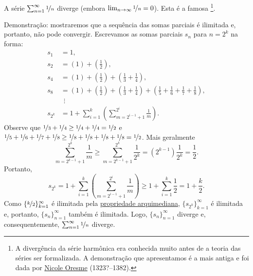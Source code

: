 \begin{example} \label{example:harmonicseries}
A série $\sum_{n=1}^\infty \nicefrac{1}{n}$ diverge (embora
$\lim_{n\to\infty} \nicefrac{1}{n} = 0$).
Esta é a famosa \emph{}%
\footnote{A divergência da série harmônica era conhecida muito
antes de a teoria das séries ser formalizada. A demonstração que
apresentamos é a mais antiga e foi dada por
\href{https://en.wikipedia.org/wiki/Oresme}{Nicole Oresme}
(1323?--1382).}.

Demonstração: mostraremos que a sequência das somas parciais é ilimitada e, portanto,
não pode convergir.
Escrevamos as somas parciais $s_n$ para $n = 2^k$ na forma:
\begin{align*}
 s_1 & = 1 , \\
 s_2 & = \left( 1 \right) + \left( \frac{1}{2} \right) , \\
 s_4 & = \left( 1 \right) + \left( \frac{1}{2} \right) +
        \left( \frac{1}{3} + \frac{1}{4} \right) , \\
 s_8 & = \left( 1 \right) + \left( \frac{1}{2} \right) +
        \left( \frac{1}{3} + \frac{1}{4} \right) +
        \left( \frac{1}{5} + \frac{1}{6} + \frac{1}{7} + \frac{1}{8} \right) , \\
& ~~ \vdots \\
 s_{2^k} & = 
1 + 
\sum_{i=1}^k
\left(
\sum_{m=2^{i-1}+1}^{2^i} \frac{1}{m}
\right) .
\end{align*}
Observe que $\nicefrac{1}{3} + \nicefrac{1}{4} \geq \nicefrac{1}{4} + \nicefrac{1}{4} =
\nicefrac{1}{2}$ e
$\nicefrac{1}{5} + \nicefrac{1}{6} + \nicefrac{1}{7} + \nicefrac{1}{8}
\geq \nicefrac{1}{8} + \nicefrac{1}{8} + \nicefrac{1}{8} + \nicefrac{1}{8} =
\nicefrac{1}{2}$. Mais geralmente
\begin{equation*}
\sum_{m=2^{k-1}+1}^{2^k} \frac{1}{m}
\geq
\sum_{m=2^{k-1}+1}^{2^k} \frac{1}{2^k}
=
(2^{k-1}) \frac{1}{2^k} = \frac{1}{2} .
\end{equation*}
Portanto,
\begin{equation*}
s_{2^k} = 
1 + 
\sum_{i=1}^k
\left(
\sum_{m=2^{i-1}+1}^{2^i} \frac{1}{m}
\right) 
\geq
1 + \sum_{i=1}^k \frac{1}{2} = 1 + \frac{k}{2} .
\end{equation*}
Como $\{ \nicefrac{k}{2} \}_{k=1}^\infty$ é ilimitada pela
\hyperref[thm:arch:i]{propriedade arquimediana},
$\{ s_{2^k} \}_{k=1}^\infty$ é ilimitada
e, portanto, $\{ s_n \}_{n=1}^\infty$ também é ilimitada.
Logo, $\{ s_n \}_{n=1}^\infty$ diverge e, consequentemente, $\sum_{n=1}^\infty \nicefrac{1}{n}$ diverge.
\end{example}

